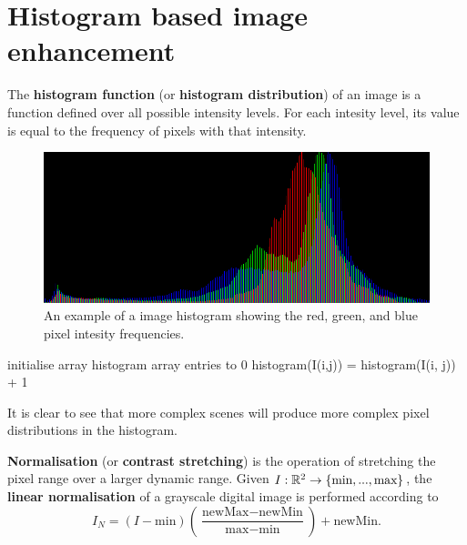 \chapter{Histogram based image enhancement}

\begin{definition}
    The \textbf{histogram function} (or \textbf{histogram distribution}) of an image is a function defined over all possible intensity levels. For each intesity level, its value is equal to the frequency of pixels with that intensity.
\end{definition}

\begin{figure}
    \centering
    \includegraphics[width=0.8\linewidth]{images/image-histogram.png}
    \caption{An example of a image histogram showing the red, green, and blue pixel intesity frequencies.}
    \label{fig:image-histogram}
\end{figure}

\begin{algorithm}
    \hspace{0em}
    \begin{algorithmic}[1]
        \State initialise array histogram array entries to $0$
            \State histogram(I(i,j)) = histogram(I(i, j)) + 1
        \EndFor
        \EndProcedure
    \end{algorithmic}
\end{algorithm}

\begin{remark}
    It is clear to see that more complex scenes will produce more complex pixel distributions in the histogram. 
\end{remark}

\begin{definition}[Normalisation]
    \textbf{Normalisation} (or \textbf{contrast stretching}) is the operation of stretching the pixel range over a larger dynamic range. Given $I: \mathbb{R}^2 \to \{ \text{min}, ..., \text{max} \}$, the \textbf{linear normalisation} of a grayscale digital image is performed according to
    \[ I_N = (I - \text{min}) \left( \frac{\text{newMax} - \text{newMin}}{\text{max} - \text{min}} \right) + \text{newMin}. \]
\end{definition}

